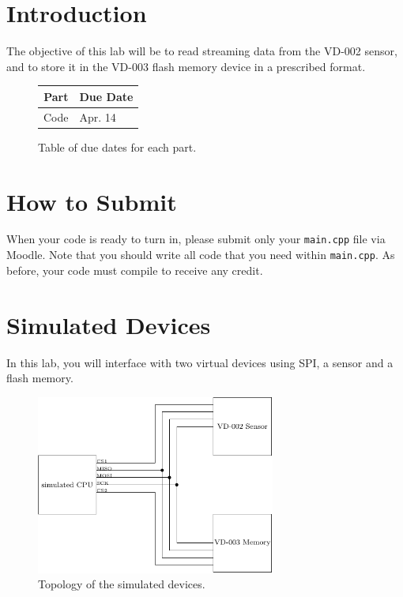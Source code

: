 \documentclass{article}
\begin{document}
\section{Introduction}

The objective of this lab will be to read streaming data from the VD-002
sensor, and to store it in the VD-003 flash memory device in a prescribed
format.

\begin{figure}[H]

	\centering

	\begin{tabular}{r|l}

		Part & Due Date \\ \hline\hline
		Code & Apr. 14\\

	\end{tabular}

	\caption{Table of due dates for each part.}

\end{figure}

\tableofcontents

\section{How to Submit }

When your code is ready to turn in, please submit only your \texttt{main.cpp}
file via Moodle. Note that you should write all code that you need within
\texttt{main.cpp}. As before, your code must compile to receive any credit.

\section{Simulated Devices}

In this lab, you will interface with two virtual devices using SPI, a sensor
and a flash memory.

\begin{figure}[H]

	\centering

        \includegraphics[max width = 0.7\textwidth]{topology.pdf}

	\caption{Topology of the simulated devices.}

\end{figure}
\end{document}
